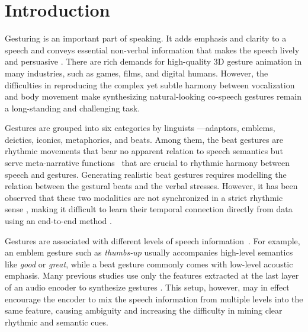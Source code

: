 \documentclass[acmtog,authorversion]{acmart}
\begin{document}
\maketitle

\section{Introduction}
\label{sec:introduction}
Gesturing is an important part of speaking. It adds emphasis and clarity to a speech and conveys essential non-verbal information that makes the speech lively and persuasive \cite{burgoon1990nonverbal}. There are rich demands for high-quality 3D gesture animation in many industries, such as games, films, and digital humans. However, the difficulties in reproducing the complex yet subtle harmony between vocalization and body movement make synthesizing natural-looking co-speech gestures remain a long-standing and challenging task.

Gestures are grouped into six categories by linguists \cite{ekman1969repertoire, mcneill1992hand}---adaptors, emblems, deictics, iconics, metaphorics, and beats. Among them, the beat gestures are rhythmic movements that bear no apparent relation to speech semantics \cite{Kipp2004_Gesture} but serve meta-narrative functions~\cite{mcneill1992hand} that are crucial to rhythmic harmony between speech and gestures. Generating realistic beat gestures requires modelling the relation between the gestural beats and the verbal stresses. However, it has been observed that these two modalities are not synchronized in a strict rhythmic sense \cite{mcclave1994gestural}, making it difficult to learn their temporal connection directly from data using an end-to-end method \cite{kucherenko2020gesticulator, yoon2020speech, bhattacharya2021speech2affectivegestures}. 

Gestures are associated with different levels of speech information~\cite{mcneill1992hand}. For example, an emblem gesture such as \emph{thumbs-up} usually accompanies high-level semantics like \emph{good} or \emph{great}, while a beat gesture commonly comes with low-level acoustic emphasis. Many previous studies use only the features extracted at the last layer of an audio encoder to synthesize gestures \cite{kucherenko2020gesticulator, yoon2020speech, bhattacharya2021speech2affectivegestures, qian2021speech, alexanderson2020style}. This setup, however, may in effect encourage the encoder to mix the speech information from multiple levels into the same feature, causing ambiguity and increasing the difficulty in mining clear rhythmic and semantic cues.
\end{document}
